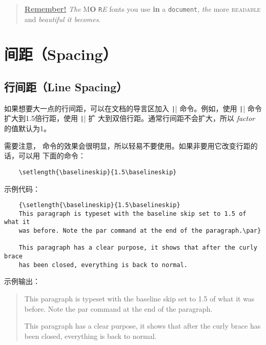 \documentclass[UTF8]{ctexart}
\begin{document}
\begin{quote}
  \underline{\textbf{Remember\Huge!}} \textit{The}
  \textsf{M\textbf{\LARGE O} \texttt{R}\textsl{E}} fonts \Huge you
  \tiny use \footnotesize \textbf{in} a \small \texttt{document},
  \large \textit{the} \normalsize more \textsc{readable} and
  \textsl{\textsf{beautiful} it bec\large o\Large m\LARGE e\huge s}.
\end{quote}

\section{间距（Spacing）}
\subsection{行间距（Line Spacing）}
如果想要大一点的行间距，可以在文档的导言区加入 \texttt|\linespread{factor}| 命令。例如，使用
\texttt|\linespread{1.3}| 命令扩大到1.5倍行距，使用 \texttt|\linespread{1.6}| 扩
大到双倍行距。通常行间距不会扩大，所以 \emph{factor} 的值默认为1。

需要注意，\texttt{\linespread} 命令的效果会很明显，所以轻易不要使用。如果非要用它改变行距的话，可以用
下面的命令：
\begin{verbatim}
    \setlength{\baselineskip}{1.5\baselineskip}
\end{verbatim}

示例代码：
\begin{verbatim}
    {\setlength{\baselineskip}{1.5\baselineskip}
    This paragraph is typeset with the baseline skip set to 1.5 of what it
    was before. Note the par command at the end of the paragraph.\par}

    This paragraph has a clear purpose, it shows that after the curly brace
    has been closed, everything is back to normal.
\end{verbatim}

示例输出：
\begin{quote}
    {\setlength{\baselineskip}{1.5\baselineskip}
    This paragraph is typeset with the baseline skip set to 1.5 of what it
    was before. Note the par command at the end of the paragraph.\par}

    This paragraph has a clear purpose, it shows that after the curly brace
    has been closed, everything is back to normal.
\end{quote}
\end{document}
